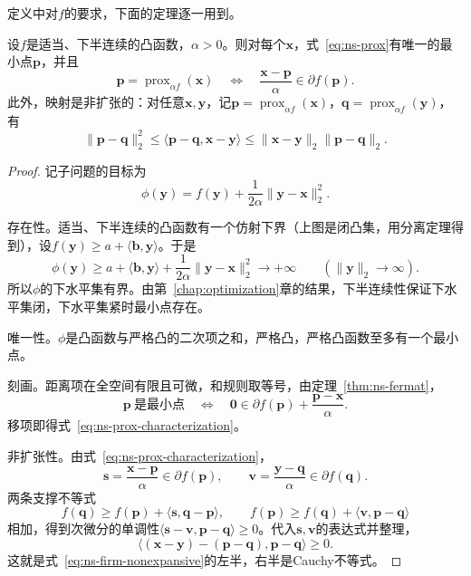 定义中对$f$的要求，下面的定理逐一用到。

\begin{theorem}
\label{thm:ns-prox}
设$f$是适当、下半连续的凸函数，$\alpha>0$。则对每个$\bm{x}$，式~\eqref{eq:ns-prox}有唯一的最小点$\bm{p}$，并且
\begin{equation}
 \bm{p}=\operatorname{prox}_{\alpha f}(\bm{x})\quad\Longleftrightarrow\quad\frac{\bm{x}-\bm{p}}{\alpha}\in\partial f(\bm{p}).
 \label{eq:ns-prox-characterization}
\end{equation}
此外，映射是非扩张的：对任意$\bm{x},\bm{y}$，记$\bm{p}=\operatorname{prox}_{\alpha f}(\bm{x})$，$\bm{q}=\operatorname{prox}_{\alpha f}(\bm{y})$，有
\begin{equation}
 \lVert\bm{p}-\bm{q}\rVert_2^2\leq\langle\bm{p}-\bm{q},\bm{x}-\bm{y}\rangle\leq\lVert\bm{x}-\bm{y}\rVert_2\lVert\bm{p}-\bm{q}\rVert_2.
 \label{eq:ns-firm-nonexpansive}
\end{equation}
\end{theorem}

\begin{proof}
记子问题的目标为
\[
 \phi(\bm{y})=f(\bm{y})+\frac{1}{2\alpha}\lVert\bm{y}-\bm{x}\rVert_2^2.
\]

存在性。适当、下半连续的凸函数有一个仿射下界（上图是闭凸集，用分离定理得到），设$f(\bm{y})\geq a+\langle\bm{b},\bm{y}\rangle$。于是
\[
 \phi(\bm{y})\geq a+\langle\bm{b},\bm{y}\rangle+\frac{1}{2\alpha}\lVert\bm{y}-\bm{x}\rVert_2^2\to+\infty\qquad(\lVert\bm{y}\rVert_2\to\infty).
\]
所以$\phi$的下水平集有界。由第~\ref{chap:optimization}章的结果，下半连续性保证下水平集闭，下水平集紧时最小点存在。

唯一性。$\phi$是凸函数与严格凸的二次项之和，严格凸，严格凸函数至多有一个最小点。

刻画。距离项在全空间有限且可微，和规则取等号，由定理~\ref{thm:ns-fermat}，
\[
 \bm{p}\ \text{是最小点}\quad\Longleftrightarrow\quad\bm{0}\in\partial f(\bm{p})+\frac{\bm{p}-\bm{x}}{\alpha}.
\]
移项即得式~\eqref{eq:ns-prox-characterization}。

非扩张性。由式~\eqref{eq:ns-prox-characterization}，
\[
 \bm{s}=\frac{\bm{x}-\bm{p}}{\alpha}\in\partial f(\bm{p}),\qquad
 \bm{v}=\frac{\bm{y}-\bm{q}}{\alpha}\in\partial f(\bm{q}).
\]
两条支撑不等式
\[
 f(\bm{q})\geq f(\bm{p})+\langle\bm{s},\bm{q}-\bm{p}\rangle,\qquad f(\bm{p})\geq f(\bm{q})+\langle\bm{v},\bm{p}-\bm{q}\rangle
\]
相加，得到次微分的单调性$\langle\bm{s}-\bm{v},\bm{p}-\bm{q}\rangle\geq0$。代入$\bm{s},\bm{v}$的表达式并整理，
\[
 \langle(\bm{x}-\bm{y})-(\bm{p}-\bm{q}),\bm{p}-\bm{q}\rangle\geq0.
\]
这就是式~\eqref{eq:ns-firm-nonexpansive}的左半，右半是Cauchy不等式。
\end{proof}

